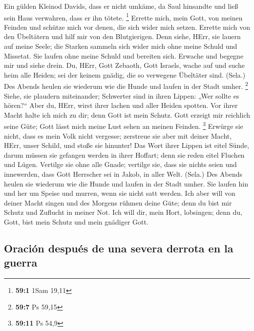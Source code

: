 Ein gülden Kleinod Davids, dass er nicht umkäme, da Saul
hinsandte und ließ sein Haus verwahren, dass er ihn tötete. \footnote{\textbf{59:1}
  1Sam 19,11}  Errette mich, mein Gott, von meinen Feinden
und schütze mich vor denen, die sich wider mich setzen. 
Errette mich von den Übeltätern und hilf mir von den Blutgierigen.
 Denn siehe, HErr, sie lauern auf meine Seele; die Starken
sammeln sich wider mich ohne meine Schuld und Missetat. 
Sie laufen ohne meine Schuld und bereiten sich. Erwache und begegne mir
und siehe drein.  Du, HErr, Gott Zebaoth, Gott Israels,
wache auf und suche heim alle Heiden; sei der keinem gnädig, die so
verwegene Übeltäter sind. (Sela.)  Des Abends heulen sie
wiederum wie die Hunde und laufen in der Stadt umher. \footnote{\textbf{59:7}
  Ps 59,15}  Siehe, sie plaudern miteinander; Schwerter
sind in ihren Lippen: „Wer sollte es hören?{}``  Aber du,
HErr, wirst ihrer lachen und aller Heiden spotten.  Vor
ihrer Macht halte ich mich zu dir; denn Gott ist mein Schutz.
 Gott erzeigt mir reichlich seine Güte; Gott lässt mich
meine Lust sehen an meinen Feinden. \footnote{\textbf{59:11} Ps 54,9}
 Erwürge sie nicht, dass es mein Volk nicht vergesse;
zerstreue sie aber mit deiner Macht, HErr, unser Schild, und stoße sie
hinunter!  Das Wort ihrer Lippen ist eitel Sünde, darum
müssen sie gefangen werden in ihrer Hoffart; denn sie reden eitel
Fluchen und Lügen.  Vertilge sie ohne alle Gnade;
vertilge sie, dass sie nichts seien und innewerden, dass Gott Herrscher
sei in Jakob, in aller Welt. (Sela.)  Des Abends heulen
sie wiederum wie die Hunde und laufen in der Stadt umher.
 Sie laufen hin und her um Speise und murren, wenn sie
nicht satt werden.  Ich aber will von deiner Macht singen
und des Morgens rühmen deine Güte; denn du bist mir Schutz und Zuflucht
in meiner Not.  Ich will dir, mein Hort, lobsingen; denn
du, Gott, bist mein Schutz und mein gnädiger Gott.

\hypertarget{oraciuxf3n-despuuxe9s-de-una-severa-derrota-en-la-guerra}{%
\subsection{Oración después de una severa derrota en la
guerra}\label{oraciuxf3n-despuuxe9s-de-una-severa-derrota-en-la-guerra}}

